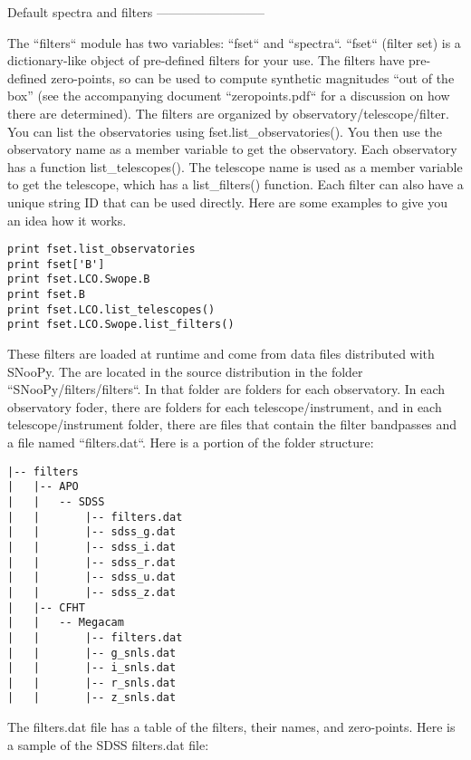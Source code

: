 Default spectra and filters\label{sub:default_filters}
--------------------------

The ``filters`` module has two variables: ``fset`` and ``spectra``.
``fset`` (filter set) is a dictionary-like object of pre-defined
filters for your use. The filters have pre-defined zero-points, so
can be used to compute synthetic magnitudes ``out of the box'' (see
the accompanying document ``zeropoints.pdf`` for a discussion
on how there are determined). The filters are organized by observatory/telescope/filter.
You can list the observatories using fset.list_observatories(). You
then use the observatory name as a member variable to get the observatory.
Each observatory has a function list_telescopes(). The telescope
name is used as a member variable to get the telescope, which has
a list_filters() function. Each filter can also have a unique string
ID that can be used directly. Here are some examples to give you an
idea how it works.

\begin{verbatim}
print fset.list_observatories
print fset['B']
print fset.LCO.Swope.B
print fset.B
print fset.LCO.list_telescopes()
print fset.LCO.Swope.list_filters()
\end{verbatim}

These filters are loaded at runtime and come from data files distributed
with SNooPy. The are located in the source distribution in the folder
``SNooPy/filters/filters``. In that folder are folders for each
observatory. In each observatory foder, there are folders for each
telescope/instrument, and in each telescope/instrument folder, there
are files that contain the filter bandpasses and a file named ``filters.dat``.
Here is a portion of the folder structure:

\begin{verbatim}
|-- filters
|   |-- APO
|   |   -- SDSS
|   |       |-- filters.dat
|   |       |-- sdss_g.dat
|   |       |-- sdss_i.dat
|   |       |-- sdss_r.dat
|   |       |-- sdss_u.dat
|   |       |-- sdss_z.dat
|   |-- CFHT
|   |   -- Megacam
|   |       |-- filters.dat
|   |       |-- g_snls.dat
|   |       |-- i_snls.dat
|   |       |-- r_snls.dat
|   |       |-- z_snls.dat
\end{verbatim}The filters.dat file has a table of the filters, their names, and
zero-points. Here is a sample of the SDSS filters.dat file:

